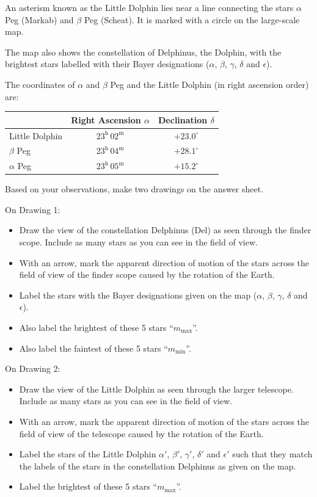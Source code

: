 An asterism known as the Little Dolphin lies near a line connecting the stars
$\alpha$ Peg (Markab) and $\beta$ Peg (Scheat). It is marked with a circle on
the large-scale map.

The map also shows the constellation of Delphinus, the Dolphin, with the
brightest stars labelled with their Bayer designations ($\alpha$, $\beta$,
$\gamma$, $\delta$ and $\epsilon$).


The coordinates of $\alpha$ and $\beta$ Peg and the Little Dolphin (in right
ascension order) are:

\begin{center}
\begin{tabular}{lcc}
 & Right Ascension $\alpha$ & Declination $\delta$ \\
\hline
Little Dolphin & $23^{\mathrm{h}}\,02^{\mathrm{m}}$ & $+23.0^\circ$ \\
$\beta$ Peg & $23^{\mathrm{h}}\,04^{\mathrm{m}}$ & $+28.1^\circ$ \\
$\alpha$ Peg & $23^{\mathrm{h}}\,05^{\mathrm{m}}$ & $+15.2^\circ$ \\
\end{tabular}
\end{center}

Based on your observations, make two drawings on the answer sheet.

On Drawing 1:
\begin{itemize}
\item Draw the view of the constellation Delphinus (Del) as seen through the
  finder scope. Include as many stars as you can see in the field of view.
\item With an arrow, mark the apparent direction of motion of the stars across
  the field of view of the finder scope caused by the rotation of the Earth.
\item Label the stars with the Bayer designations given on the map ($\alpha$,
  $\beta$, $\gamma$, $\delta$ and $\epsilon$).
\item Also label the brightest of these 5 stars ``$m_{\max}$''.
\item Also label the faintest of these 5 stars ``$m_{\min}$''.
\end{itemize}

On Drawing 2:
\begin{itemize}
\item Draw the view of the Little Dolphin as seen through the larger
  telescope. Include as many stars as you can see in the field of view.
\item With an arrow, mark the apparent direction of motion of the stars across
  the field of view of the telescope caused by the rotation of the Earth.
\item Label the stars of the Little Dolphin $\alpha'$, $\beta'$, $\gamma'$,
  $\delta'$ and $\epsilon'$ such that they match the labels of the stars in
  the constellation Delphinus as given on the map.
\item Label the brightest of these 5 stars ``$m_{\max}$''.
\end{itemize}
